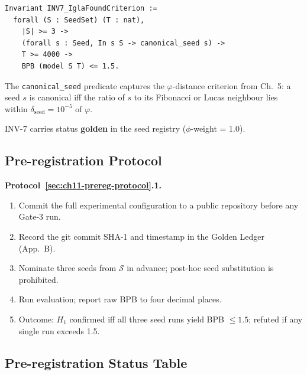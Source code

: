 \begin{verbatim}
Invariant INV7_IglaFoundCriterion :=
  forall (S : SeedSet) (T : nat),
    |S| >= 3 ->
    (forall s : Seed, In s S -> canonical_seed s) ->
    T >= 4000 ->
    BPB (model S T) <= 1.5.
\end{verbatim}

The \texttt{canonical\_seed} predicate captures
the \(\varphi\)-distance criterion from Ch.~5: a
seed \(s\) is canonical iff the ratio of \(s\) to
its Fibonacci or Lucas neighbour lies within
\(\delta_{\text{seed}} = 10^{-5}\) of \(\varphi\).

INV-7 carries status \textbf{golden} in the seed
registry (\(\phi\)-weight = 1.0).

\subsection{Pre-registration Protocol}
\label{subsec:ch11-prereg-protocol}

\textbf{Protocol~\ref{sec:ch11-prereg-protocol}.1.}

\begin{enumerate}
\item Commit the full experimental configuration to a public repository
      before any Gate-3 run.
\item Record the git commit SHA-1 and timestamp in the Golden Ledger (App.~B).
\item Nominate three seeds from \(\mathcal{S}\) in advance;
      post-hoc seed substitution is prohibited.
\item Run evaluation; report raw BPB to four decimal places.
\item Outcome: \(H_1\) confirmed iff all three seed runs yield BPB \(\leq 1.5\);
      refuted if any single run exceeds 1.5.
\end{enumerate}

\subsection{Pre-registration Status Table}
\label{subsec:ch11-prereg-status}

